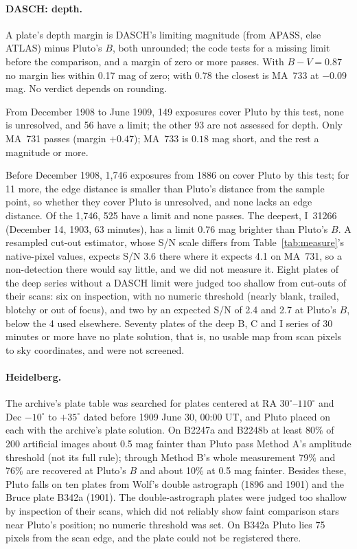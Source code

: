 \documentclass[11pt]{article}
\begin{document}
\begin{appendices}
\paragraph{DASCH: depth.} A plate's depth margin is DASCH's limiting magnitude (from APASS, else ATLAS) minus Pluto's $B$, both unrounded; the code tests for a missing limit before the comparison, and a margin of zero or more passes. With $B-V=0.87$ no margin lies within 0.17 mag of zero; with 0.78 the closest is MA~733 at $-0.09$ mag. No verdict depends on rounding.

From December 1908 to June 1909, 149 exposures cover Pluto by this test, none is unresolved, and 56 have a limit; the other 93 are not assessed for depth. Only MA~731 passes (margin $+0.47$); MA~733 is $0.18$ mag short, and the rest a magnitude or more.

Before December 1908, 1,746 exposures from 1886 on cover Pluto by this test; for 11 more, the edge distance is smaller than Pluto's distance from the sample point, so whether they cover Pluto is unresolved, and none lacks an edge distance. Of the 1,746, 525 have a limit and none passes. The deepest, I~31266 (December 14, 1903, 63 minutes), has a limit 0.76 mag brighter than Pluto's $B$. A resampled cut-out estimator, whose S/N scale differs from Table~\ref{tab:measure}'s native-pixel values, expects S/N 3.6 there where it expects 4.1 on MA~731, so a non-detection there would say little, and we did not measure it. Eight plates of the deep series without a DASCH limit were judged too shallow from cut-outs of their scans: six on inspection, with no numeric threshold (nearly blank, trailed, blotchy or out of focus), and two by an expected S/N of 2.4 and 2.7 at Pluto's $B$, below the 4 used elsewhere. Seventy plates of the deep B, C and I series of 30 minutes or more have no plate solution, that is, no usable map from scan pixels to sky coordinates, and were not screened.

\paragraph{Heidelberg.} The archive's plate table was searched for plates centered at RA $30^\circ$--$110^\circ$ and Dec $-10^\circ$ to $+35^\circ$ dated before 1909 June 30, 00:00 UT, and Pluto placed on each with the archive's plate solution. On B2247a and B2248b at least 80\% of 200 artificial images about 0.5 mag fainter than Pluto pass Method A's amplitude threshold (not its full rule); through Method B's whole measurement 79\% and 76\% are recovered at Pluto's $B$ and about 10\% at 0.5 mag fainter. Besides these, Pluto falls on ten plates from Wolf's double astrograph (1896 and 1901) and the Bruce plate B342a (1901). The double-astrograph plates were judged too shallow by inspection of their scans, which did not reliably show faint comparison stars near Pluto's position; no numeric threshold was set. On B342a Pluto lies 75 pixels from the scan edge, and the plate could not be registered there.


\end{appendices}
\end{document}
